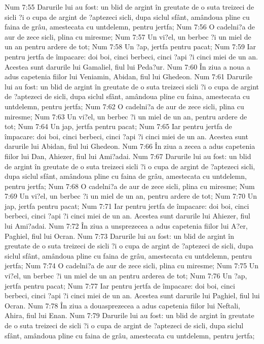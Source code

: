 Num 7:55  Darurile lui au fost: un blid de argint în greutate de o suta treizeci de sicli ?i o cupa de argint de ?aptezeci sicli, dupa siclul sfânt, amândoua pline cu faina de grâu, amestecata cu untdelemn, pentru jertfa;
Num 7:56  O cadelni?a de aur de zece sicli, plina cu miresme;
Num 7:57  Un vi?el, un berbec ?i un miel de un an pentru ardere de tot;
Num 7:58  Un ?ap, jertfa pentru pacat;
Num 7:59  Iar pentru jertfa de împacare: doi boi, cinci berbeci, cinci ?api ?i cinci miei de un an. Acestea sunt darurile lui Gamaliel, fiul lui Peda?ur.
Num 7:60  În ziua a noua a adus capetenia fiilor lui Veniamin, Abidan, fiul lui Ghedeon.
Num 7:61  Darurile lui au fost: un blid de argint în greutate de o suta treizeci sicli ?i o cupa de argint de ?aptezeci de sicli, dupa siclul sfânt, amândoua pline cu faina, amestecata cu untdelemn, pentru jertfa;
Num 7:62  O cadelni?a de aur de zece sicli, plina cu miresme;
Num 7:63  Un vi?el, un berbec ?i un miel de un an, pentru ardere de tot;
Num 7:64  Un jap, jertfa pentru pacat;
Num 7:65  Iar pentru jertfa de împacare: doi boi, cinci berbeci, cinci ?api ?i cinci miei de un an. Acestea sunt darurile lui Abidan, fiul lui Ghedeon.
Num 7:66  În ziua a zecea a adus capetenia fiilor lui Dan, Ahiezer, fiul lui Ami?adai.
Num 7:67  Darurile lui au fost: un blid de argint în greutate de o suta treizeci sicli ?i o cupa de argint de ?aptezeci sicli, dupa siclul sfânt, amândoua pline cu faina de grâu, amestecata cu untdelemn, pentru jertfa;
Num 7:68  O cadelni?a de aur de zece sicli, plina cu miresme;
Num 7:69  Un vi?el, un berbec ?i un miel de un an, pentru ardere de tot;
Num 7:70  Un jap, jertfa pentru pacat;
Num 7:71  Iar pentru jertfa de împacare: doi boi, cinci berbeci, cinci ?api ?i cinci miei de un an. Acestea sunt darurile lui Ahiezer, fiul lui Ami?adai.
Num 7:72  În ziua a unsprezecea a adus capetenia fiilor lui A?er, Paghiel, fiul lui Ocran.
Num 7:73  Darurile lui au fost: un blid de argint în greutate de o suta treizeci de sicli ?i o cupa de argint de ?aptezeci de sicli, dupa siclul sfânt, amândoua pline cu faina de grâu, amestecata cu untdelemn, pentru jertfa;
Num 7:74  O cadelni?a de aur de zece sicli, plina cu miresme;
Num 7:75  Un vi?el, un berbec ?i un miel de un an pentru arderea de tot;
Num 7:76  Un ?ap, jertfa pentru pacat;
Num 7:77  Iar pentru jertfa de împacare: doi boi, cinci berbeci, cinci ?api ?i cinci miei de un an. Acestea sunt darurile lui Paghiel, fiul lui Ocran.
Num 7:78  În ziua a douasprezecea a adus capetenia fiilor lui Neftali, Ahira, fiul lui Enan.
Num 7:79  Darurile lui au fost: un blid de argint în greutate de o suta treizeci de sicli ?i o cupa de argint de ?aptezeci de sicli, dupa siclul sfânt, amândoua pline cu faina de grâu, amestecata cu untdelemn, pentru jertfa;
